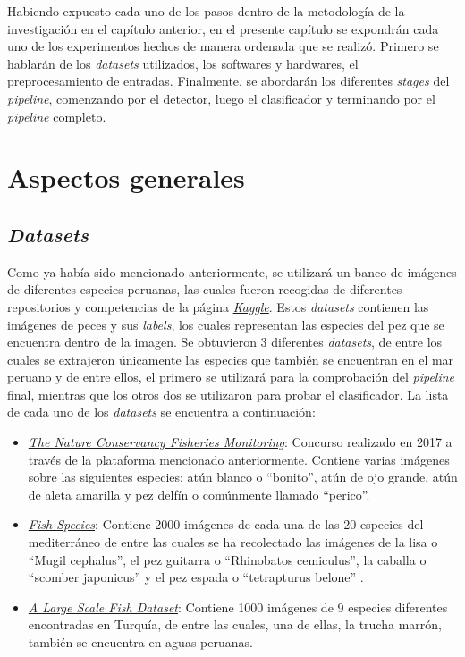 Habiendo expuesto cada uno de los pasos dentro de la metodología de la investigación en el capítulo anterior, 
en el presente capítulo se expondrán cada uno de los experimentos hechos de manera ordenada 
que se realizó. Primero se hablarán de los \textit{datasets} utilizados, los softwares y 
hardwares, el preprocesamiento de entradas. Finalmente, se abordarán los diferentes 
\textit{stages} del \textit{pipeline}, comenzando por el detector, luego el clasificador y 
terminando por el \textit{pipeline} completo.

\section{Aspectos generales}
\subsection{\textit{Datasets}}
Como ya había sido mencionado anteriormente, se utilizará un banco de imágenes de diferentes especies peruanas, las cuales fueron recogidas de  diferentes repositorios y competencias de la página \href{https://www.kaggle.com/}{\textit{Kaggle}}. Estos \textit{datasets}  contienen las imágenes de peces y sus \textit{labels}, los cuales representan las especies del pez que se encuentra dentro de la imagen. Se obtuvieron 3 diferentes \textit{datasets}, de entre los cuales se extrajeron únicamente las especies que también se encuentran en el mar peruano y de entre ellos, el primero se utilizará para la comprobación del \textit{pipeline} final, mientras que los otros dos se utilizaron para probar el clasificador. La lista de cada uno de los \textit{datasets} se encuentra a continuación:
\begin{itemize}
    \item \href{https://www.kaggle.com/c/the-nature-conservancy-fisheries-monitoring}{\textit{The Nature Conservancy Fisheries Monitoring}}: Concurso realizado en 2017 a través de la plataforma mencionado anteriormente. Contiene varias imágenes sobre las siguientes especies: atún blanco o ``bonito'', atún de ojo grande, atún de aleta amarilla y pez delfín o comúnmente llamado ``perico''.
    \item \href{https://www.kaggle.com/datasets/giannisgeorgiou/fish-species}{\textit{Fish Species}}: Contiene 2000 imágenes de cada una de las 20 especies del mediterráneo de entre las cuales se ha recolectado las imágenes de la lisa o ``Mugil cephalus'', el pez guitarra o ``Rhinobatos cemiculus'', la caballa o ``scomber japonicus'' y el pez espada o ``tetrapturus belone'' . 
    \item \href{https://www.kaggle.com/datasets/crowww/a-large-scale-fish-dataset}{\textit{A Large Scale Fish Dataset}}: Contiene 1000 imágenes de 9 especies diferentes encontradas en Turquía, de entre las cuales, una de ellas, la trucha marrón, también se encuentra en aguas peruanas. 
\end{itemize}

